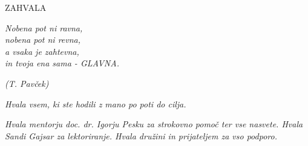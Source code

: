 
  \begin{center}
    \Large
    ZAHVALA
  \end{center}

  \vspace{1cm}

  \begin{minipage}[t]{0.35\textwidth}
  \textit{
    Nobena pot ni ravna,\\
    nobena pot ni revna,\\
    a vsaka je zahtevna,\\
    in tvoja ena sama - GLAVNA.
  }  
    \begin{flushright}
      \textit{(T. Pavček)}
    \end{flushright}  
  
  \end{minipage}

  \vspace{1cm}

  \begin{sloppypar}
    \textit{Hvala vsem, ki ste hodili z mano po poti do cilja.}
  \end{sloppypar}

  \vspace{1cm}

  \begin{sloppypar}
    \textit{Hvala mentorju doc. dr. Igorju Pesku za strokovno pomoč ter vse nasvete. Hvala
      Sandi Gajsar za lektoriranje. Hvala družini in prijateljem za vso
      podporo.} 
  \end{sloppypar}

  \vfill


